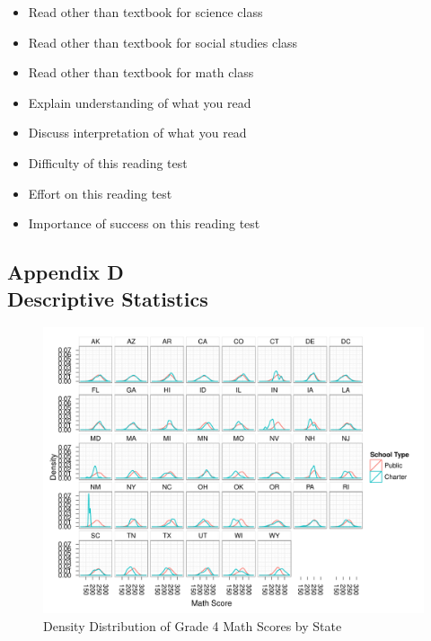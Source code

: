 \documentclass[letterpaper,12pt]{article}
\begin{document}
\begin{singlespace}
\begin{itemize}
	\item Read other than textbook for science class
	\item Read other than textbook for social studies class
	\item Read other than textbook for math class
	\item Explain understanding of what you read
	\item Discuss interpretation of what you read
	\item Difficulty of this reading test
	\item Effort on this reading test
	\item Importance of success on this reading test
\end{itemize}
\end{singlespace}

\newpage
{}
\subsection*{Appendix D\\Descriptive Statistics}
\label{appendixDescriptives}

\begin{singlespace}

 \clearpage
 \clearpage
\begin{figure}[h]
\begin{center}
\includegraphics[width=\textwidth,angle=90]{../Figures/g4mathDensityByState.pdf}
\caption{Density Distribution of Grade 4 Math Scores by State}
\label{fig:g4math:density}
\end{center}
\end{figure}
\clearpage

\end{singlespace}
\end{document}
